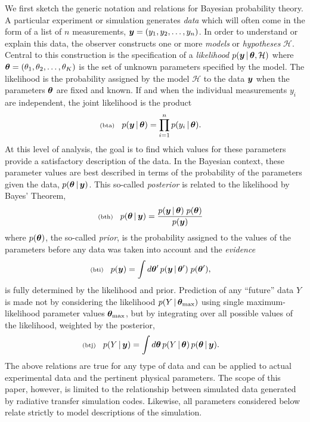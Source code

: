 \documentclass[11pt]{article}
\newcommand{\lleq}[1]{\label{#1} }
\renewcommand{\lleq}[1]{\label{#1} {\scriptstyle {\rm (#1)}} \hspace*{2ex} }
\newcommand{\hypo}  {{\mathcal{H}}}  %
\newcommand{\cond}{\,|\,}
\begin{document}
We first sketch the generic notation and relations for Bayesian
probability theory.
%
A particular experiment or simulation generates
\textit{data}
which will often come in the form of a list of $n$ measurements,
${\bm{y}} = (y_1,y_2,\ldots,y_n)$. In order to understand or explain this
data, the observer constructs one or more \textit{models} or
\textit{hypotheses} $\hypo$. Central to this construction is the
specification of a \textit{likelihood} $p(\bmy\cond \bmtheta,\hypo)$
where ${\bm{\theta}} = (\theta_1,\theta_2,\ldots,\theta_K)$ is the set of
unknown parameters specified by the model. The likelihood is the
probability assigned by the model $\hypo$ to the data ${\bm{y}}$ when the
parameters ${\bm{\theta}}$ are fixed and known.
%
If and when the individual measurements $y_i$ are independent, the
joint likelihood is the product
\begin{align}
  \lleq{bta}
  p(\bmy\cond \bmtheta) &= \prod_{i=1}^n p(y_i\cond \bmtheta).
\end{align}
At this level of analysis, the goal is to find which values for these
parameters provide a satisfactory description of the data. In the
Bayesian context, these parameter values are best described in terms
of the probability of the parameters given the data,
$p(\bmtheta\cond \bmy)$. This so-called \textit{posterior} is related
to the likelihood by Bayes' Theorem,
\begin{align}
  \lleq{bth}
  p(\bmtheta\cond \bmy)
  &= \frac{p(\bmy\cond\bmtheta)\;p(\bmtheta)}
    {p(\bmy)}
\end{align}
where $p({\bm{\theta}})$, the so-called \textit{prior}, is the probability
assigned to the values of the parameters before any data was taken
into account and the \textit{evidence}
\begin{align}
  \lleq{bti}
  p(\bmy) &= \int d\bmtheta'\, p(\bmy\cond\bmtheta')\;p(\bmtheta'),
\end{align}
is fully determined by the likelihood and prior.
%
Prediction of any ``future'' data $Y$ is made not by considering the
likelihood $p(Y\cond\bmtheta_{\rm max})$ using single
maximum-likelihood parameter values ${\bm{\theta}}_{\rm max}$, but by
integrating over all possible values of the likelihood, weighted by
the posterior,
\begin{align}
  \lleq{btj}
  p(Y\cond \bmy) &= \int d\bmtheta\,p(Y\cond\bmtheta)\,p(\bmtheta\cond \bmy).
\end{align}
The above relations are true for any type of data and can be applied
to actual experimental data and the pertinent physical parameters. The
scope of this paper, however, is limited to the relationship between
simulated data generated by radiative transfer simulation codes.
Likewise, all parameters considered below relate strictly to model
descriptions of the simulation.
\end{document}
